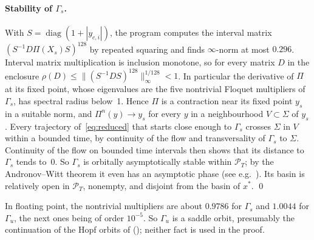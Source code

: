 \documentclass[11pt,a4paper]{report}
\begin{document}
\paragraph{Stability of $\Gamma_s$.} With $S=\operatorname{diag}(1+|y_{c,i}|)$, the program computes the interval matrix $(S^{-1}D\Pi(X_s)S)^{128}$ by repeated squaring and finds $\infty$-norm at most $0.296$. Interval matrix multiplication is inclusion monotone, so for every matrix $D$ in the enclosure $\rho(D)\le\|(S^{-1}DS)^{128}\|_\infty^{1/128}<1$. In particular the derivative of $\Pi$ at its fixed point, whose eigenvalues are the five nontrivial Floquet multipliers of $\Gamma_s$, has spectral radius below~1. Hence $\Pi$ is a contraction near its fixed point $y_s$ in a suitable norm, and $\Pi^n(y)\to y_s$ for every $y$ in a neighbourhood $V\subset\Sigma$ of $y_s$. Every trajectory of~\eqref{eq:reduced} that starts close enough to $\Gamma_s$ crosses $\Sigma$ in $V$ within a bounded time, by continuity of the flow and transversality of $\Gamma_s$ to $\Sigma$. Continuity of the flow on bounded time intervals then shows that its distance to $\Gamma_s$ tends to~0. So $\Gamma_s$ is orbitally asymptotically stable within $\mathcal P_T$; by the Andronov--Witt theorem it even has an asymptotic phase (see e.g.~\autocite{Hartman1964}). Its basin is relatively open in $\mathcal P_T$, nonempty, and disjoint from the basin of $x^*$. \qed

In floating point, the nontrivial multipliers are about $0.9786$ for $\Gamma_s$ and $1.0044$ for $\Gamma_u$, the next ones being of order $10^{-5}$. So $\Gamma_u$ is a saddle orbit, presumably the continuation of the Hopf orbits of  (); neither fact is used in the proof.
\end{document}
